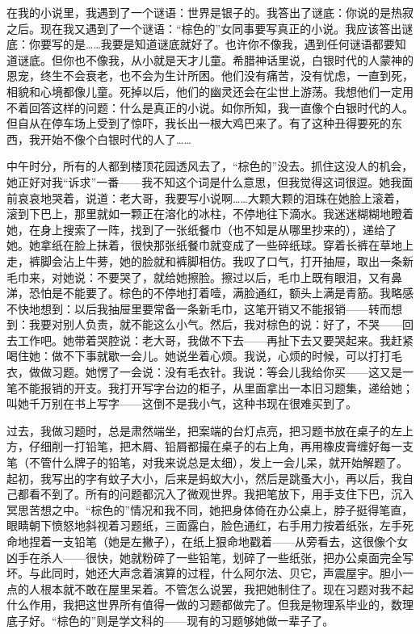 在我的小说里，我遇到了一个谜语：世界是银子的。我答出了谜底：你说的是热寂之后。现在我又遇到了一个谜语：“棕色的”女同事要写真正的小说。我应该答出谜底：你要写的是……我要是知道谜底就好了。也许你不像我，遇到任何谜语都要知道谜底。但你也不像我，从小就是天才儿童。希腊神话里说，白银时代的人蒙神的恩宠，终生不会衰老，也不会为生计所困。他们没有痛苦，没有忧虑，一直到死，相貌和心境都像儿童。死掉以后，他们的幽灵还会在尘世上游荡。我想他们一定用不着回答这样的问题：什么是真正的小说。如你所知，我一直像个白银时代的人。但自从在停车场上受到了惊吓，我长出一根大鸡巴来了。有了这种丑得要死的东西，我开始不像个白银时代的人了…… 

中午时分，所有的人都到楼顶花园透风去了，“棕色的”没去。抓住这没人的机会，她正好对我“诉求”一番——我不知这个词是什么意思，但我觉得这词很逗。她我面前哀哀地哭着，说道：老大哥，我要写小说啊……大颗大颗的泪珠在她脸上滚着，滚到下巴上，那里就如一颗正在溶化的冰柱，不停地往下滴水。我迷迷糊糊地瞪着她，在身上搜索了一阵，找到了一张纸餐巾（也不知是从哪里抄来的），递给了她。她拿纸在脸上抹着，很快那张纸餐巾就变成了一些碎纸球。穿着长裤在草地上走，裤脚会沾上牛蒡，她的脸就和裤脚相仿。我叹了口气，打开抽屉，取出一条新毛巾来，对她说：不要哭了，就给她擦脸。擦过以后，毛巾上既有眼泪，又有鼻涕，恐怕是不能要了。棕色的不停地打着噎，满脸通红，额头上满是青筋。我略感不快地想到：以后我抽屉里要常备一条新毛巾，这笔开销又不能报销——转而想到：我要对别人负责，就不能这么小气。然后，我对棕色的说：好了，不哭——回去工作吧。她带着哭腔说：老大哥，我做不下去——再扯下去又要哭起来。我赶紧喝住她：做不下事就歇一会儿。她说坐着心烦。我说，心烦的时候，可以打打毛衣，做做习题。她愣了一会说：没有毛衣针。我说：等会儿我给你买——这又是一笔不能报销的开支。我打开写字台边的柜子，从里面拿出一本旧习题集，递给她；叫她千万别在书上写字——这倒不是我小气，这种书现在很难买到了。 

过去，我做习题时，总是肃然端坐，把案端的台灯点亮，把习题书放在桌子的左上方，仔细削一打铅笔，把木屑、铅屑都撮在桌子的右上角，再用橡皮膏缠好每一支笔（不管什么牌子的铅笔，对我来说总是太细），发上一会儿呆，就开始解题了。起初，我写出的字有蚊子大小，后来是蚂蚁大小，然后是跳蚤大小，再以后，我自己都看不到了。所有的问题都沉入了微观世界。我把笔放下，用手支住下巴，沉入冥思苦想之中。“棕色的”情况和我不同，她把身体倚在办公桌上，脖子挺得笔直，眼睛朝下愤怒地斜视着习题纸，三面露白，脸色通红，右手用力按着纸张，左手死命地捏着一支铅笔（她是左撇子），在纸上狠命地戳着——从旁看去，这很像个女凶手在杀人——很快，她就粉碎了一些铅笔，划碎了一些纸张，把办公桌面完全写坏。与此同时，她还大声念着演算的过程，什么阿尔法、贝它，声震屋宇。胆小一点的人根本就不敢在屋里呆着。不管怎么说罢，我把她制住了。现在习题对我不起什么作用，我把这世界所有值得一做的习题都做完了。但我是物理系毕业的，数理底子好。“棕色的”则是学文科的——现有的习题够她做一辈子了。 

